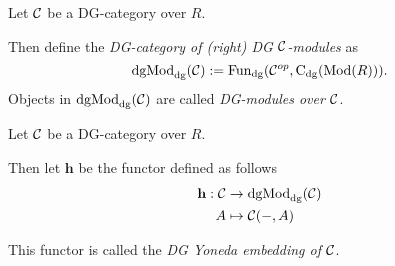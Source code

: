 \begin{definition}[\( \dgMod_{\dg}(\Cc) \)]
    Let \( {\mathcal{C}} \) be a DG-category over \( R \).

    Then define the \emph{DG-category of (right) DG \( {\mathcal{C}} \)-modules} as
    \[
        \operatorname{dgMod}_{\operatorname{dg}}({\mathcal{C}}) := \operatorname{Fun}_{\operatorname{dg}}({\mathcal{C}}^{op}, \operatorname{C}_{\operatorname{dg}}(\operatorname{Mod}(R))).
    \]
    Objects in \( \dgMod_{\dg}(\Cc) \) are called \emph{DG-modules over \( {\mathcal{C}} \)}.
\end{definition}

\begin{definition}
    \label{def:DG_Yoneda_embedding}
    Let \( {\mathcal{C}} \) be a DG-category over \( R \).
    
    Then let \( \mathbf{h} \) be the functor defined as follows
    \begin{align*}
        \mathbf{h}: {\mathcal{C}} &\to \operatorname{dgMod}_{\operatorname{dg}}({\mathcal{C}}) \\
        A &\mapsto {\mathcal{C}}(-, A)
    \end{align*}

    This functor is called the \emph{DG Yoneda embedding of \( {\mathcal{C}} \)}.
\end{definition}


